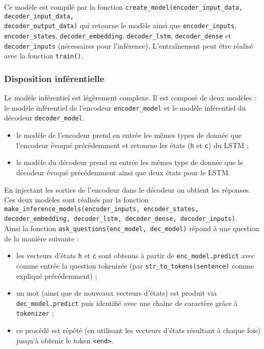 \documentclass[10pt,a4paper]{article}
\newcommand\tab[1][0.5cm]{\hspace*{#1}}
\begin{document}
Ce modèle est compilé par la fonction \texttt{create\_model(encoder\_input\_data, decoder\_input\_data,} \\ \texttt{decoder\_output\_data)} qui retourne le modèle ainsi que \texttt{encoder\_inputs}, \texttt{encoder\_states}, \texttt{decoder\_embedding}, \texttt{decoder\_lstm}, \texttt{decoder\_dense} et \texttt{decoder\_inputs} (nécessaires pour l'inférence). L'entraînement peut être réalisé avec la fonction \texttt{train()}.
\subsubsection{Disposition inférentielle}
Le modèle inférentiel est légèrement complexe. Il est composé de deux modèles : le modèle inférentiel de l'encodeur \texttt{encoder\_model} et le modèle inférentiel du décodeur \texttt{decoder\_model}.
\begin{itemize}
\item le modèle de l'encodeur prend en entrée les mêmes types de donnée que l'encodeur évoqué précédemment et retourne les états (\texttt{h} et \texttt{c}) du LSTM ;
\item le modèle du décodeur prend en entrée les mêmes type de donnée que le décodeur évoqué précédemment ainsi que deux états pour le LSTM. 
\end{itemize}
En injectant les sorties de l'encodeur dans le décodeur on obtient les réponses. Ces deux modèles sont réalisés par la fonction \texttt{make\_inference\_models(encoder\_inputs, encoder\_states, decoder\_embedding, decoder\_lstm, decoder\_dense, decoder\_inputs)}. \\
\tab Ainsi la fonction \texttt{ask\_questions(enc\_model, dec\_model)} répond à une question de la manière suivante :
\begin{itemize}
\item les vecteurs d'états \texttt{h} et \texttt{c} sont obtenus à partir de \texttt{enc\_model.predict} avec comme entrée la question tokenizée (par \texttt{str\_to\_tokens(sentence)} comme expliqué précédemment) ;
\item un mot (ainsi que de nouveaux vecteurs d'états) est produit via \texttt{dec\_model.predict} puis identifié avec une chaîne de caractère grâce à \texttt{tokenizer} ;
\item ce procédé est répété (en utilisant les vecteurs d'états résultant à chaque fois) jusqu'à obtenir le token \texttt{<end>}.
\end{itemize}
\end{document}
